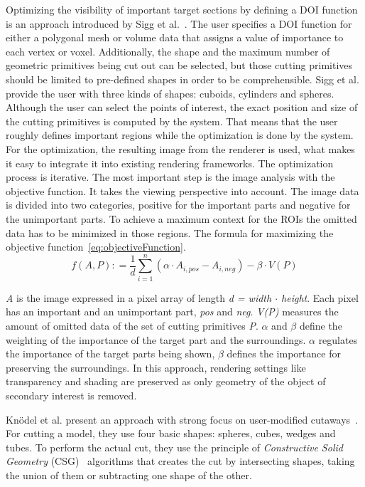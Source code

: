Optimizing the visibility of important target sections by defining a DOI function is an approach introduced by Sigg et al.~\cite{proc:intelligentCutaway}. The user specifies a DOI function for either a polygonal mesh or volume data that assigns a value of importance to each vertex or voxel. Additionally, the shape and the maximum number of geometric primitives being cut out can be selected, but those cutting primitives should be limited to pre-defined shapes in order to be comprehensible. Sigg et al. provide the user with three kinds of shapes: cuboids, cylinders and spheres. Although the user can select the points of interest, the exact position and size of the cutting primitives is computed by the system. That means that the user roughly defines important regions while the optimization is done by the system. For the optimization, the resulting image from the renderer is used, what makes it easy to integrate it into existing rendering frameworks. The optimization process is iterative. The most important step is the image analysis with the objective function. It takes the viewing perspective into account. The image data is divided into two categories, positive for the important parts and negative for the unimportant parts. To achieve a maximum context for the ROIs the omitted data has to be minimized in those regions. The formula for maximizing the objective function~\ref{eq:objectiveFunction}.
\begin{equation}
f(A, P) \colon= \frac{1}{d} \sum^n_{i=1} (\alpha\cdot A_{i,pos} - A_{i,neg}) - \beta\cdot V(P)
\label{eq:objectiveFunction}
\end{equation}

\emph{A} is the image expressed in a pixel array of length \emph{d = width $\cdot$ height}. Each pixel has an important and an unimportant part, \emph{pos} and \emph{neg}. \emph{V(P)} measures the amount of omitted data of the set of cutting primitives \emph{P}. $\alpha$ and $\beta$ define the weighting of the importance of the target part and the surroundings. $\alpha$ regulates the importance of the target parts being shown, $\beta$ defines the importance for preserving the surroundings. In this approach, rendering settings like transparency and shading are preserved as only geometry of the object of secondary interest is removed.

Kn{\"o}del et al. present an approach with strong focus on user-modified cutaways~\cite{incoll:cutawayIllustration}. For cutting a model, they use four basic shapes: spheres, cubes, wedges and tubes. To perform the actual cut, they use the principle of \emph{Constructive Solid Geometry} (CSG)~\cite{book:computerGraphicsHearn}\cite{book:computerGraphicsHill} algorithms that creates the cut by intersecting shapes, taking the union of them or subtracting one shape of the other.

